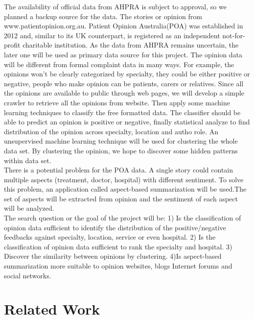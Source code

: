 \documentclass[10pt,twocolumn]{article}
\begin{document}
The availability of official data from AHPRA is subject to approval, so we planned a backup source for the data. The stories or opinion from www.patientopinion.org.au. Patient Opinion Australia(POA) was established in 2012 and, similar to its UK counterpart, is registered as an independent not-for-profit charitable institution. As the data from AHPRA remains uncertain, the later one will be used as primary data source for this project. The opinion data will be different from formal complaint data in many ways. For example, the opinions won’t be clearly categorized by specialty, they could be either positive or negative, people who make opinion can be patients, carers or relatives. Since all the opinions are available to public through web pages, we will develop a simple crawler to retrieve all the opinions from website. Then apply some machine learning techniques to classify the free formatted data. The classifier should be able to predict an opinion is positive or negative, finally statistical analyze to find distribution of the opinion across specialty, location and autho role. An unsupervised machine learning technique will be used for clustering the whole data set. By clustering the opinion, we hope to discover some hidden patterns within data set.\\
There is a potential problem for the POA data. A single story could contain multiple aspects (treatment, doctor, hospital) with different sentiment. To solve this problem, an application called aspect-based summarization\cite{ref11} will be used.The set of aspects will be extracted from opinion and the sentiment of each aspect will be analyzed.\\
The search question or the goal of the project will be: 1) Is the classification of opinion data sufficient to identify the distribution of the positive/negative feedbacks against specialty, location, service or even hospital. 2) Is the classification of opinion data sufficient to rank the specialty and hospital. 3) Discover the similarity between opinions by clustering. 4)Is aspect-based summarization more suitable to opinion websites, blogs Internet forums and social networks.

\section{Related Work}
\end{document}
